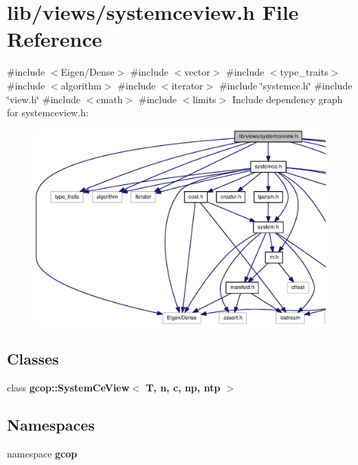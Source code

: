 \section{lib/views/systemceview.h \-File \-Reference}
\label{systemceview_8h}
{\ttfamily \#include $<$\-Eigen/\-Dense$>$}\*
{\ttfamily \#include $<$vector$>$}\*
{\ttfamily \#include $<$type\-\_\-traits$>$}\*
{\ttfamily \#include $<$algorithm$>$}\*
{\ttfamily \#include $<$iterator$>$}\*
{\ttfamily \#include \char`\"{}systemce.\-h\char`\"{}}\*
{\ttfamily \#include \char`\"{}view.\-h\char`\"{}}\*
{\ttfamily \#include $<$cmath$>$}\*
{\ttfamily \#include $<$limits$>$}\*
\-Include dependency graph for systemceview.\-h\-:
\nopagebreak
\begin{figure}[H]
\begin{center}
\leavevmode
\includegraphics[width=350pt]{systemceview_8h__incl}
\end{center}
\end{figure}
\subsection*{\-Classes}
\begin{DoxyCompactItemize}
\item 
class {\bf gcop\-::\-System\-Ce\-View$<$ T, n, c, np, ntp $>$}
\end{DoxyCompactItemize}
\subsection*{\-Namespaces}
\begin{DoxyCompactItemize}
\item 
namespace {\bf gcop}
\end{DoxyCompactItemize}
